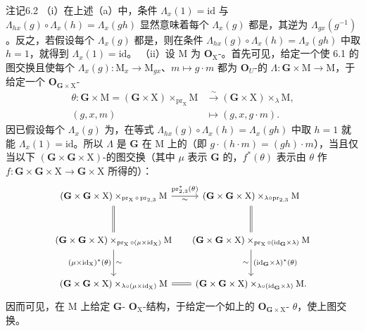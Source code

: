 \begin{SGAresult}{注记}{6.2}
（i）在上述（a）中，条件 $\Lambda_x(1)=\mathrm{id}$ 与 $\Lambda_{hx}(g)\circ\Lambda_x(h)=\Lambda_x(gh)$ 显然意味着每个 $\Lambda_x(g)$ 都是，其逆为 $\Lambda_{gx}(g^{-1})$。反之，若假设每个 $\Lambda_x(g)$ 都是，则在条件 $\Lambda_{hx}(g)\circ\Lambda_x(h)=\Lambda_x(gh)$ 中取 $h=1$，就得到 $\Lambda_x(1)=\mathrm{id}$。
（ii）设 $\mathrm M$ 为 $\mathbf O_{\mathrm X}$-。首先可见，给定一个使 6.1 的图交换且使每个 $\Lambda_x(g):\mathrm M_x\to\mathrm M_{gx}$、$m\mapsto g\cdot m$ 都为 $\mathbf O_U$-的 $\Lambda:\mathbf G\times\mathrm M\to\mathrm M$，于给定一个 $\mathbf O_{\mathbf G\times\mathrm X}$-
\[
\begin{aligned}
\theta:\mathbf G\times\mathrm M=(\mathbf G\times\mathrm X)\times_{\operatorname{pr}_{\mathrm X}}\mathrm M&\xrightarrow\sim(\mathbf G\times\mathrm X)\times_\lambda\mathrm M,\\
(g,x,m)&\longmapsto(g,x,g\cdot m).
\end{aligned}
\]
因已假设每个 $\Lambda_x(g)$ 为，在等式 $\Lambda_{hx}(g)\circ\Lambda_x(h)=\Lambda_x(gh)$ 中取 $h=1$ 就能 $\Lambda_x(1)=\mathrm{id}$。所以 $\Lambda$ 是 $\mathbf G$ 在 $\mathrm M$ 上的（即 $g\cdot(h\cdot m)=(gh)\cdot m$），当且仅当以下 $(\mathbf G\times\mathbf G\times\mathrm X)$-的图交换（其中 $\mu$ 表示 $\mathbf G$ 的，$f^*(\theta)$ 表示由 $\theta$ 作 $f:\mathbf G\times\mathbf G\times\mathrm X\to\mathbf G\times\mathrm X$ 所得的）：
\[
\begin{tikzcd}[column sep=small,row sep=large,font=\small]
(\mathbf G\times\mathbf G\times\mathrm X)\times_{\operatorname{pr}_{\mathrm X}\circ\operatorname{pr}_{2,3}}\mathrm M\arrow[r,"{\operatorname{pr}_{2,3}^*(\theta)}","{\sim}"']\arrow[d,equal] & (\mathbf G\times\mathbf G\times\mathrm X)\times_{\lambda\circ\operatorname{pr}_{2,3}}\mathrm M\arrow[d,equal]\\
(\mathbf G\times\mathbf G\times\mathrm X)\times_{\operatorname{pr}_{\mathrm X}\circ(\mu\times\mathrm{id}_{\mathrm X})}\mathrm M\arrow[d,"{(\mu\times\mathrm{id}_{\mathrm X})^*(\theta)}"',"{\sim}"] & (\mathbf G\times\mathbf G\times\mathrm X)\times_{\operatorname{pr}_{\mathrm X}\circ(\mathrm{id}_{\mathbf G}\times\lambda)}\mathrm M\arrow[d,"{(\mathrm{id}_{\mathbf G}\times\lambda)^*(\theta)}","{\sim}"']\\
(\mathbf G\times\mathbf G\times\mathrm X)\times_{\lambda\circ(\mu\times\mathrm{id}_{\mathrm X})}\mathrm M\arrow[r,equal] & (\mathbf G\times\mathbf G\times\mathrm X)\times_{\lambda\circ(\mathrm{id}_{\mathbf G}\times\lambda)}\mathrm M.
\end{tikzcd}
\]
因而可见，在 $\mathrm M$ 上给定 $\mathbf G$- $\mathbf O_{\mathrm X}$-结构，于给定一个如上的 $\mathbf O_{\mathbf G\times\mathrm X}$- $\theta$，使上图交换。


\end{SGAresult}
